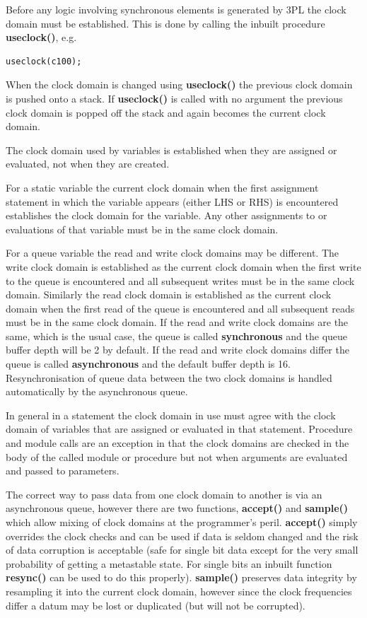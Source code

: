 \documentclass[10pt,a4paper,twoside,fleqn]{article}
\newcommand{\kwd}[1]{{\bf #1}} %
\begin{document}
    Before any logic involving synchronous elements is generated by 3PL the
    clock domain must be established. This is done by calling the inbuilt
    procedure \kwd{useclock()}, e.g.
    \begin{lstlisting}[language=threepl]
        useclock(c100);
    \end{lstlisting}
    
    When the clock domain is changed using \kwd{useclock()} the previous clock domain
    is pushed onto a stack. If \kwd{useclock()} is called with no argument the previous
    clock domain is popped off the stack and again becomes the current clock domain.
    
    The clock domain used by variables is established when they are assigned
    or evaluated, not when they are created.
    
    For a static variable the current clock domain when the first assignment statement
    in which the variable appears (either LHS or RHS) is encountered establishes the
    clock domain for the variable. Any other assignments to or evaluations of that
    variable must be in the same clock domain.
    
    For a queue variable the read and write clock domains may be different. The write
    clock domain is established as the current clock domain when the first write to the
    queue is encountered and all subsequent writes must be in the same clock domain.
    Similarly the read clock domain is established as the current clock domain when the
    first read of the queue is encountered and all subsequent reads must be in the same
    clock domain. If the read and write clock domains are the same, which is the usual
    case, the queue is called {\bf synchronous} and the queue buffer depth will be 2 by
    default. If the read and write clock domains differ the queue is called {\bf
    asynchronous} and the default buffer depth is 16. Resynchronisation of queue data
    between the two clock domains is handled automatically by the asynchronous queue.
    
    In general in a statement the clock domain in use must agree with the clock
    domain of variables that are assigned or evaluated in that statement.
    Procedure and module calls are an exception in that the clock domains are
    checked in the body of the called module or procedure but not when arguments
    are evaluated and passed to parameters.
    
    The correct way to pass data from one clock domain to another is via an
    asynchronous queue, however there are two functions, \kwd{accept()} and
    \kwd{sample()} which allow mixing of clock domains at the programmer's
    peril. \kwd{accept()} simply overrides the clock checks and can be used if
    data is seldom changed and the risk of data corruption is acceptable (safe
    for single bit data except for the very small probability of getting a
    metastable state. For single bits an inbuilt function \kwd{resync()} can be
    used to do this properly). \kwd{sample()} preserves data integrity by
    resampling it into the current clock domain, however since the clock
    frequencies differ a datum may be lost or duplicated (but will not be
    corrupted).
\end{document}
